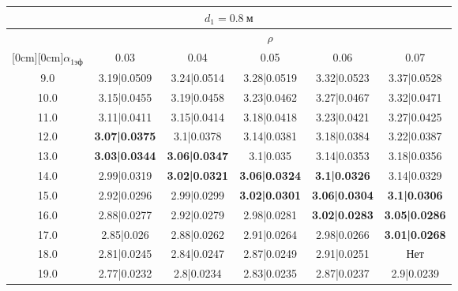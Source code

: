 \documentclass[20pt]{article}
\begin{document}
\begin{center}
\begin{tabular}{c|ccccc}
\hline
	\multicolumn{6}{c}{$d_{1}=0.8 \ м$} \\
\hline
	 & \multicolumn{5}{|c}{$\rho$} \\
	\cline{2-6}
	\raisebox{1.5ex}[0cm][0cm]{$\alpha_{1эф}$} & 0.03 & 0.04 & 0.05 & 0.06 & 0.07\\
\hline
	9.0 & 	3.19|0.0509 & 	3.24|0.0514 & 	3.28|0.0519 & 	3.32|0.0523 & 	3.37|0.0528\\
	10.0 & 	3.15|0.0455 & 	3.19|0.0458 & 	3.23|0.0462 & 	3.27|0.0467 & 	3.32|0.0471\\
	11.0 & 	3.11|0.0411 & 	3.15|0.0414 & 	3.18|0.0418 & 	3.23|0.0421 & 	3.27|0.0425\\
	12.0 & 	\textbf{3.07|0.0375} & 	3.1|0.0378 & 	3.14|0.0381 & 	3.18|0.0384 & 	3.22|0.0387\\
	13.0 & 	\textbf{3.03|0.0344} & 	\textbf{3.06|0.0347} & 	3.1|0.035 & 	3.14|0.0353 & 	3.18|0.0356\\
	14.0 & 	2.99|0.0319 & 	\textbf{3.02|0.0321} & 	\textbf{3.06|0.0324} & 	\textbf{3.1|0.0326} & 	3.14|0.0329\\
	15.0 & 	2.92|0.0296 & 	2.99|0.0299 & 	\textbf{3.02|0.0301} & 	\textbf{3.06|0.0304} & 	\textbf{3.1|0.0306}\\
	16.0 & 	2.88|0.0277 & 	2.92|0.0279 & 	2.98|0.0281 & 	\textbf{3.02|0.0283} & 	\textbf{3.05|0.0286}\\
	17.0 & 	2.85|0.026 & 	2.88|0.0262 & 	2.91|0.0264 & 	2.98|0.0266 & 	\textbf{3.01|0.0268}\\
	18.0 & 	2.81|0.0245 & 	2.84|0.0247 & 	2.87|0.0249 & 	2.91|0.0251 & 	Нет\\
	19.0 & 	2.77|0.0232 & 	2.8|0.0234 & 	2.83|0.0235 & 	2.87|0.0237 & 	2.9|0.0239\\
\end{tabular}


\end{center}
\end{document}
